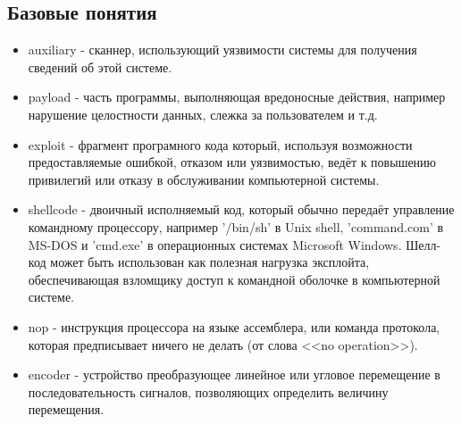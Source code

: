 \subsection{Базовые понятия}
\begin{itemize}
	\item auxiliary - сканнер, использующий уязвимости системы для получения 
	сведений об этой системе.%
	\item payload - часть программы, выполняющая вредоносные действия, 
	например нарушение целостности данных, слежка за пользователем и т.д.%
	\item exploit - фрагмент програмного кода который, используя
	возможности предоставляемые ошибкой, отказом или уязвимостью, ведёт к
	повышению привилегий или отказу в обслуживании компьютерной системы.
	\item shellcode - двоичный исполняемый код, который обычно передаёт 
	управление командному процессору, например '/bin/sh' в Unix shell, 
	'command.com' в MS-DOS и 'cmd.exe' в операционных системах Microsoft 
	Windows. Шелл-код может быть использован как полезная нагрузка эксплойта, 
	обеспечивающая взломщику доступ к командной оболочке в компьютерной 
	системе.
	\item nop - инструкция процессора на языке ассемблера, или команда 
	протокола, которая предписывает ничего не делать (от слова <<no 
	operation>>).
	\item encoder - устройство преобразующее линейное или угловое перемещение 
	в последовательность сигналов, позволяющих определить величину 
	перемещения. 
\end{itemize}

